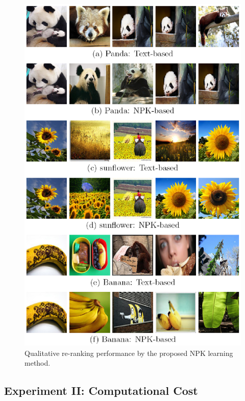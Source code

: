 \begin{figure}[!ht]
\includegraphics[width=5in]{figures/civr-results.eps}%
\caption{Qualitative re-ranking performance by the proposed NPK learning method.} \label{fig:civr-illustration}
\end{figure}


\subsection{Experiment II: Computational Cost}

